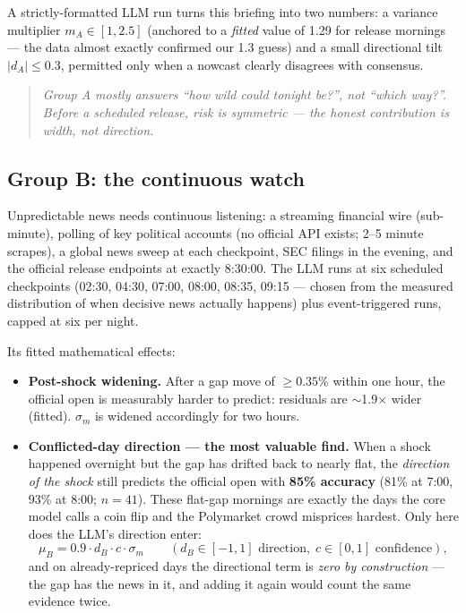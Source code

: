\documentclass[11pt,a4paper]{article}
\newcommand{\intuition}[1]{\begin{quote}\small\itshape #1\end{quote}}
\begin{document}
A strictly-formatted LLM run turns this briefing into two numbers: a variance
multiplier $m_A \in [1, 2.5]$ (anchored to a \emph{fitted} value of 1.29 for
release mornings --- the data almost exactly confirmed our 1.3 guess) and a
small directional tilt $|d_A| \le 0.3$, permitted only when a nowcast clearly
disagrees with consensus.

\intuition{Group A mostly answers ``how wild could tonight be?'', not ``which
way?''. Before a scheduled release, risk is symmetric --- the honest
contribution is width, not direction.}

\subsection{Group B: the continuous watch}

Unpredictable news needs continuous listening: a streaming financial wire
(sub-minute), polling of key political accounts (no official API exists; 2--5
minute scrapes), a global news sweep at each checkpoint, SEC filings in the
evening, and the official release endpoints at exactly 8:30:00. The LLM runs at
six scheduled checkpoints (02:30, 04:30, 07:00, 08:00, 08:35, 09:15 --- chosen
from the measured distribution of when decisive news actually happens) plus
event-triggered runs, capped at six per night.

Its fitted mathematical effects:
\begin{itemize}
\item \textbf{Post-shock widening.} After a gap move of $\ge0.35\%$ within one
hour, the official open is measurably harder to predict: residuals are
$\sim$1.9$\times$ wider (fitted). $\sigma_m$ is widened accordingly for two
hours.
\item \textbf{Conflicted-day direction --- the most valuable find.} When a
shock happened overnight but the gap has drifted back to nearly flat, the
\emph{direction of the shock} still predicts the official open with
\textbf{85\% accuracy} (81\% at 7:00, 93\% at 8:00; $n=41$). These flat-gap
mornings are exactly the days the core model calls a coin flip and the
Polymarket crowd misprices hardest. Only here does the LLM's direction enter:
\[
\mu_B = 0.9 \cdot d_B \cdot c \cdot \sigma_m
\qquad (d_B \in [-1,1] \text{ direction},\; c \in [0,1] \text{ confidence}),
\]
and on already-repriced days the directional term is \emph{zero by
construction} --- the gap has the news in it, and adding it again would count
the same evidence twice.
\end{itemize}
\end{document}
